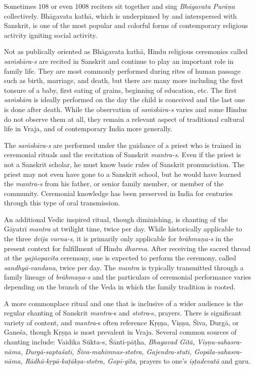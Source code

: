 Sometimes 108 or even 1008 reciters sit together and sing {\sl Bhāgavata Purāṇa} collectively. Bhāgavata kathā, which is underpinned by and interspersed with Sanskrit, is one of the most popular and colorful forms of contemporary religious activity igniting social activity. 

Not as publically oriented as Bhāgavata kathā, Hindu religious ceremonies called {\sl saṁskāra-s}
 are recited in Sanskrit and continue to play an important role in family life. They are most commonly performed during rites of human passage such as birth, marriage, and death, but there are many more including the first tonsure of a baby, first eating of grains, beginning of education, etc. The first {\sl saṁskāra} is ideally performed on the day the child is conceived and the last one is done after death. While the observation of {\sl saṁskāra-s} varies and some Hindus do not observe them at all, they remain a relevant aspect of traditional cultural life in Vraja, and of contemporary India more generally.

The {\sl saṁskāra-s} are performed under the guidance of a priest who is trained in ceremonial rituals and the recitation of Sanskrit {\sl mantra-s}. Even if the priest is not a Sanskrit scholar, he must know basic rules of Sanskrit pronunciation. The priest may not even have gone to a Sanskrit school, but he would have learned the {\sl mantra-s} from his father, or senior family member, or member of the community. Ceremonial knowledge has been preserved in India for centuries through this type of oral transmission. 

An additional Vedic inspired ritual, though diminishing, is chanting of the Gāyatrī {\sl mantra} at twilight time, twice per day. While historically applicable to the three {\sl dvija varna-s}, it is primarily only applicable for {\sl brāhmaṇa-s} in the present context for fulfillment of Hindu {\sl dharma}. After receiving the sacred thread at the {\sl yajñopavīta} ceremony, one is expected to perform the ceremony, called {\sl sandhyā-vandana}, twice per day. The {\sl mantra} is typically transmitted through a family lineage of {\sl brāhmaṇa-s} and the particulars of ceremonial performance varies depending on the branch of the  Veda in which the family tradition is rooted. 

A more commonplace ritual and one that is inclusive of a wider audience is the regular chanting of Sanskrit {\sl mantra}-s and {\sl stotra}-s, prayers. There is significant variety of content, and {\sl mantra}-s often reference Kṛṣṇa, Viṣṇu, Śiva, Durgā, or Ganeśa, though Kṛṣṇa is most prevalent in Vraja. Several common sources of chanting include: Vaidika Sūkta-s, Śānti-pāṭha, {\sl Bhagavad Gītā, Viṣṇu-sahasra-nāma, Durgā-saptaśatī, Śiva-mahimnas-stotra, Gajendra-stuti, Gopāla-sahasra-nāma, Rādhā-kṛpā-kaṭākṣa-stotra, Gopī-gīta}, prayers to one’s {\sl iṣṭadevatā} and guru. 

